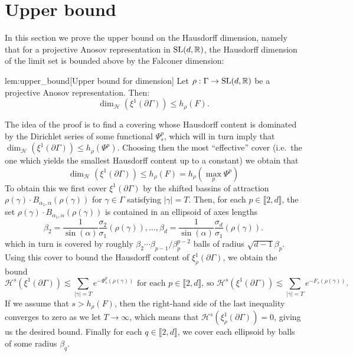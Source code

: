 \documentclass{report}
\begin{document}
\chapter{Upper bound}\label{ch:upper_bound}
In this section we prove the upper bound on the Hausdorff dimension, namely that for a projective Anosov representation in $\operatorname{{\mathrm{SL}}}(d, \mathbb R)$, the Hausdorff dimension of the limit set is bounded above by the Falconer dimension:
\begin{replemma}{lem:upper_bound}[Upper bound for dimension]
    Let $\rho: \Gamma \to \operatorname{{\mathrm{SL}}}(d, \mathbb R)$ be a projective Anosov representation. 
    Then:
    \[
        \dim_{\mathcal H}(\xi^1 (\partial \Gamma) ) \leq h_\rho(F).
    \]
\end{replemma}
    
The idea of the proof is to find a covering whose Hausdorff content is dominated by the Dirichlet series of some functional $\Psi_s^p$, which will in turn imply that $\dim_{\mathcal H}(\xi^1(\partial \Gamma)) \leq h_\rho(\Psi^p) $.
Choosing then the most ``effective'' cover (i.e.\ the one which yields the smallest Hausdorff content up to a constant) we obtain that
\[
    \dim_{\mathcal H}(\xi^1(\partial \Gamma)) \leq h_\rho(F) = h_\rho \left(\max_p \Psi^p \right)
\]
To obtain this we first cover $\xi^1(\partial \Gamma)$ by the shifted bassins of attraction $\rho(\gamma) \cdot B_{\alpha_1, \alpha} (\rho(\gamma))$ for $\gamma \in \Gamma$ satisfying $|\gamma| = T$.
Then, for each $p \in \llbracket 2, d \rrbracket$, the set $\rho(\gamma) \cdot B_{\alpha_1, \alpha} (\rho(\gamma))$ is contained in an ellipsoid of axes lengths
\[
    \beta_2 = \frac{1}{\sin(\alpha)} \frac{\sigma_2}{\sigma_1}(\rho(\gamma)), \ldots, 
    \beta_d = \frac{1}{\sin(\alpha)} \frac{\sigma_d}{\sigma_1}(\rho(\gamma)).
\]
which in turn is covered by roughly $\beta_2 \cdots \beta_{p-1}/\beta_p^{p-2}$ balls of radius $\sqrt{d-1} \beta_p$.
Using this cover to bound the Hausdorff content of $\xi_\rho^1(\partial \Gamma)$, we obtain the bound
\[
    \mathcal H^s(\xi^1(\partial \Gamma)) \lesssim \sum_{|\gamma| = T} e^{-\Psi_s^p(\rho(\gamma))} \text{ for each } p \in \llbracket 2, d \rrbracket \text{, so } \mathcal H^s(\xi^1(\partial \Gamma)) \lesssim \sum_{|\gamma| = T} e^{-F_s(\rho(\gamma))}.
\]
If we assume that $s > h_\rho(F)$, then the right-hand side of the last inequality converges to zero as we let $T \to \infty$, which means that $\mathcal H^s(\xi_\rho^1(\partial \Gamma)) = 0$, giving us the desired bound.
Finally for each $q \in \llbracket 2, d \rrbracket$, we cover each ellipsoid by balls of some radius $\beta_q$.
\end{document}
